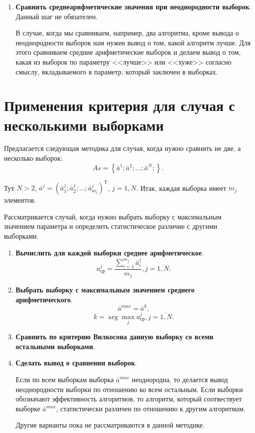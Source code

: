 \documentclass[a4paper,12pt]{article}
\begin{document}
\begin{enumerate}
\item \textbf{Сравнить среднеарифметические значения при неоднородности выборок}. Данный шаг не обязателен.

В случае, когда мы сравниваем, например, два алгоритма, кроме вывода о неоднородности выборок нам нужен вывод о том, какой алгоритм лучше. Для этого сравниваем средние арифметические выборок и делаем вывод о том, какая из выборок по параметру <<лучше>> или <<хуже>> согласно смыслу, вкладываемого в параметр, который заключен в выборках.

\end{enumerate}

\section{Применения критерия для случая с несколькими выборками}\label{WilcoxonW:section_samples}

Предлагается следующая методика для случая, когда нужно сравнить не две, а несколько выборок:
\begin{equation}
As = \left\lbrace \bar{a}^1; \bar{a}^2; \ldots; \bar{a}^N; \right\rbrace.
\end{equation}

Тут $ N>2 $, $ \bar{a}^j=\left(\bar{a}^j_1 ;\bar{a}^j_2;\ldots;\bar{a}^j_{m_j} \right)^\mathrm{T} $, $ j=\overline{1,N}$. Итак, каждая выборка имеет $ m_j $ элементов.

Рассматривается случай, когда нужно выбрать выборку с максимальным значением параметра и определить статистическое различие с другими выборками.

\begin{enumerate}
\item \textbf{Вычислить для каждой выборки среднее арифметическое}.
\begin{equation}
a^j_{\text{ср}}=\dfrac{\sum_{i=1}^{m_j} \bar{a}^j_{i}}{m_j}, j=\overline{1,N}.
\end{equation}

\item \textbf{Выбрать выборку с максимальным значением среднего арифметического}.
\begin{equation}
\bar{a}^{max}=\bar{a}^{k},
\end{equation}
\begin{equation*}
k=\arg {\max_{j} {a^j_{\text{ср}}}}, j=\overline{1,N}.
\end{equation*}

\item \textbf{Сравнить по критерию Вилкосона данную выборку со всеми остальными выборками}.

\item \textbf{Сделать вывод о сравнении выборок}.

Если по всем выборкам выборка $\bar{a}^{max}$ неоднородна, то делается вывод неоднородности выборки по отношению ко всем остальным. Если выборки обозначают эффективность алгоритмов, то алгоритм, который соотвествует выборке $\bar{a}^{max}$, статистически различен по отношению к другим алгоритмам.

Другие варианты пока не рассматриваются в данной методике.
\end{enumerate}
\end{document}
